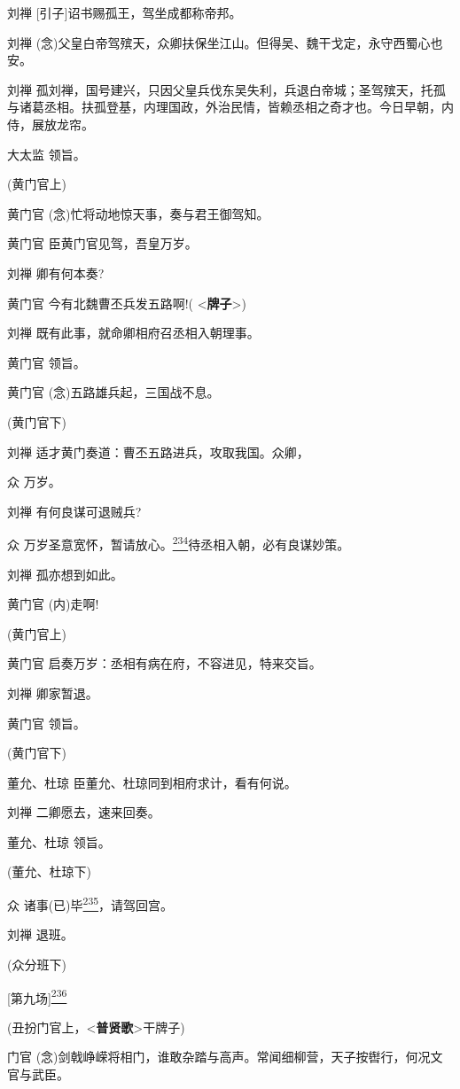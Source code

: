 刘禅 {[}引子{]}诏书赐孤王，驾坐成都称帝邦。

刘禅
(念)父皇白帝驾殡天，众卿扶保坐江山。但得吴、魏干戈定，永守西蜀心也安。

刘禅
孤刘禅，国号建兴，只因父皇兵伐东吴失利，兵退白帝城；圣驾殡天，托孤与诸葛丞相。扶孤登基，内理国政，外治民情，皆赖丞相之奇才也。今日早朝，内侍，展放龙帘。

大太监 领旨。

(黄门官上)

黄门官 (念)忙将动地惊天事，奏与君王御驾知。

黄门官 臣黄门官见驾，吾皇万岁。

刘禅 卿有何本奏?

黄门官 今有北魏曹丕兵发五路啊!( \textless{}\textbf{牌子}\textgreater{})

刘禅 既有此事，就命卿相府召丞相入朝理事。

黄门官 领旨。

黄门官 (念)五路雄兵起，三国战不息。

(黄门官下)

刘禅 适才黄门奏道：曹丕五路进兵，攻取我国。众卿，

众 万岁。

刘禅 有何良谋可退贼兵?

众
万岁圣意宽怀，暂请放心。\protect\hyperlink{fn234}{\textsuperscript{234}}待丞相入朝，必有良谋妙策。

刘禅 孤亦想到如此。

黄门官 (内)走啊!

(黄门官上)

黄门官 启奏万岁：丞相有病在府，不容进见，特来交旨。

刘禅 卿家暂退。

黄门官 领旨。

(黄门官下)

董允、杜琼 臣董允、杜琼同到相府求计，看有何说。

刘禅 二卿愿去，速来回奏。

董允、杜琼 领旨。

(董允、杜琼下)

众
诸事(已)毕\protect\hyperlink{fn235}{\textsuperscript{235}}，请驾回宫。

刘禅 退班。

(众分班下)

{[}第九场{]}\protect\hyperlink{fn236}{\textsuperscript{236}}

(丑扮门官上，\textless{}\textbf{普贤歌}\textgreater{}干牌子)

门官
(念)剑戟峥嵘将相门，谁敢杂踏与高声。常闻细柳营，天子按辔行，何况文官与武臣。

